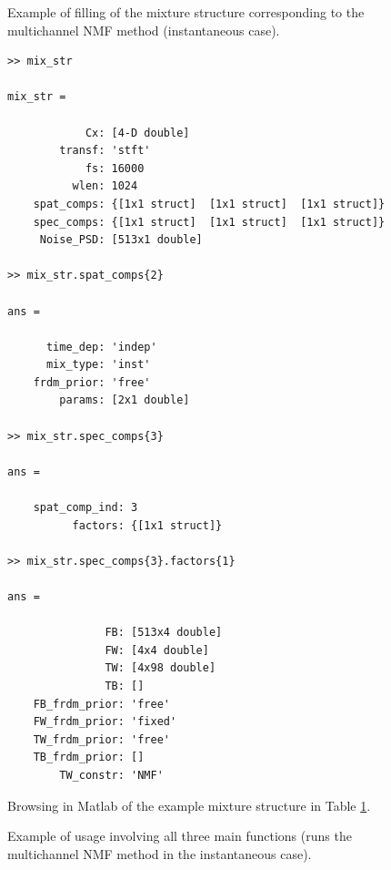 \documentclass{article}
\begin{document}
\begin{figure}[t]
\begin{center}
	
    \caption{Example of filling of the mixture structure corresponding to the multichannel NMF method \cite{Ozerov2009b} (instantaneous case).}
    \label{Tab_MixStructFillingExample}
\end{center}
\end{figure}

\begin{figure}[t]
\begin{center}
	\begin{lstlisting}
>> mix_str

mix_str = 

            Cx: [4-D double]
        transf: 'stft'
            fs: 16000
          wlen: 1024
    spat_comps: {[1x1 struct]  [1x1 struct]  [1x1 struct]}
    spec_comps: {[1x1 struct]  [1x1 struct]  [1x1 struct]}
     Noise_PSD: [513x1 double]

>> mix_str.spat_comps{2}

ans = 

      time_dep: 'indep'
      mix_type: 'inst'
    frdm_prior: 'free'
        params: [2x1 double]

>> mix_str.spec_comps{3}

ans = 

    spat_comp_ind: 3
          factors: {[1x1 struct]}

>> mix_str.spec_comps{3}.factors{1}

ans = 

               FB: [513x4 double]
               FW: [4x4 double]
               TW: [4x98 double]
               TB: []
    FB_frdm_prior: 'free'
    FW_frdm_prior: 'fixed'
    TW_frdm_prior: 'free'
    TB_frdm_prior: []
        TW_constr: 'NMF'
	\end{lstlisting}
    \caption{Browsing in Matlab of the example mixture structure in Table \ref{Tab_MixStructFillingExample}.}
    \label{Tab_MixStrBowsing}
\end{center}
\end{figure}


\begin{figure}[t]
\begin{center}
	
    \caption{Example of usage involving all three main functions (runs the multichannel NMF method \cite{Ozerov2009b} in the instantaneous case).}
    \label{Tab_UsageExamp}
\end{center}
\end{figure}
\end{document}
